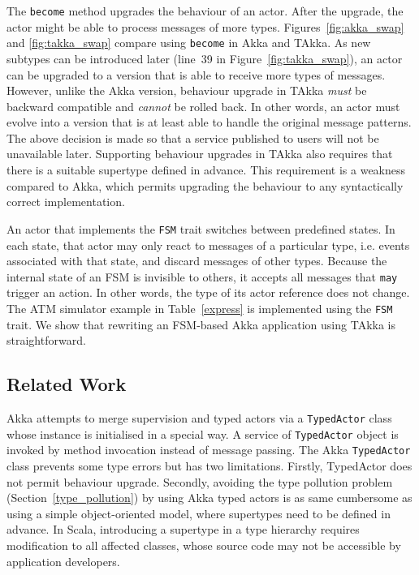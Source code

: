 The {\tt become} method upgrades the behaviour of an  actor.  After the upgrade, the
actor might be able to process messages of more types.  Figures~\ref{fig:akka_swap}
and \ref{fig:takka_swap} compare using {\tt become} in Akka and TAkka.  
As new subtypes can be introduced later (line~39 in Figure~\ref{fig:takka_swap}), an
actor can be upgraded to a version that is able to receive more types of messages.
However, unlike
the Akka version, behaviour upgrade in TAkka {\it  must} be backward 
compatible and {\it cannot} be rolled back.  In other words, 
an actor must evolve into a version that is at least able to handle the original
message patterns.  The above decision is made so that a service published to 
users will not be unavailable later.  Supporting behaviour upgrades in TAkka also
requires that there is a suitable supertype defined in advance. This requirement
is a weakness compared to Akka, which permits upgrading the behaviour to 
any syntactically correct implementation.

An actor that implements the {\tt FSM} trait switches between predefined states.  In each
state, that actor may only react to messages of a particular type, i.e. events associated with
that state, and discard messages of other types.  Because the internal state of an FSM
is invisible to others, it accepts all messages that {\tt may} trigger an action.  In other words,
the type of its actor reference does not change.  
The ATM simulator example in Table~\ref{express} is implemented using
the {\tt FSM} trait.  We show that rewriting an FSM-based Akka application using TAkka
is straightforward.

\subsection{Related Work}

Akka attempts to merge supervision and typed actors via a {\tt TypedActor} class
whose instance is initialised in a special way. A service 
of {\tt TypedActor} object is invoked by method invocation instead of message 
passing.   The Akka {\tt TypedActor} class prevents some type errors but has 
two limitations. Firstly, TypedActor does not permit behaviour upgrade. 
Secondly, avoiding the type pollution problem (Section~\ref{type_pollution}) by 
using Akka typed actors is as same cumbersome as using a simple 
object-oriented model, where supertypes need to be defined in advance. In 
Scala, introducing a supertype in a type hierarchy requires modification to all 
affected classes, whose source code may not be accessible by application 
developers.


